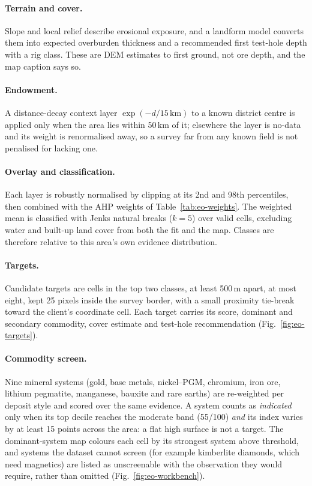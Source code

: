 \documentclass[10pt,a4paper,twocolumn]{article}
\begin{document}
\paragraph{Terrain and cover.} Slope and local relief describe erosional exposure,
and a landform model converts them into expected overburden thickness and a
recommended first test-hole depth with a rig class. These are DEM estimates to first
ground, not ore depth, and the map caption says so.

\paragraph{Endowment.} A distance-decay context layer $\exp(-d/15\,\mathrm{km})$ to a
known district centre is applied only when the area lies within 50\,km of it;
elsewhere the layer is no-data and its weight is renormalised away, so a survey far
from any known field is not penalised for lacking one.

\paragraph{Overlay and classification.} Each layer is robustly normalised by
clipping at its 2nd and 98th percentiles, then combined with the AHP weights of
Table~\ref{tab:eo-weights}. The weighted mean is classified with Jenks natural breaks
\cite{jenks1967} ($k=5$) over valid cells, excluding water and built-up land cover from both the fit
and the map. Classes are therefore relative to this area's own evidence distribution.

\paragraph{Targets.} Candidate targets are cells in the top two classes, at least
500\,m apart, at most eight, kept 25 pixels inside the survey border, with a small
proximity tie-break toward the client's coordinate cell. Each target carries its
score, dominant and secondary commodity, cover estimate and test-hole recommendation
(Fig.~\ref{fig:eo-targets}).

\paragraph{Commodity screen.} Nine mineral systems (gold, base metals, nickel--PGM,
chromium, iron ore, lithium pegmatite, manganese, bauxite and rare earths) are
re-weighted per deposit style and scored over the same evidence. A system counts as
\emph{indicated} only when its top decile reaches the moderate band (55/100)
\emph{and} its index varies by at least 15 points across the area: a flat high
surface is not a target. The dominant-system map colours each cell by its strongest
system above threshold, and systems the dataset cannot screen (for example
kimberlite diamonds, which need magnetics) are listed as unscreenable with the
observation they would require, rather than omitted
(Fig.~\ref{fig:eo-workbench}).
\end{document}
